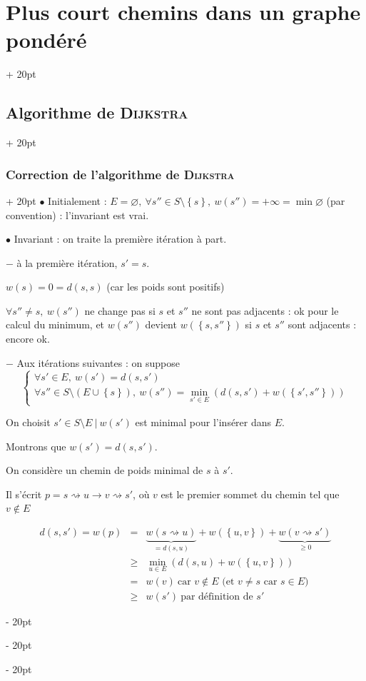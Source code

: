 \documentclass[a4paper, 12pt, twoside]{article}
\newcommand{\set}[1]{\left\{ #1 \right\}}
\renewcommand{\ge}{\geqslant}
\newcommand{\ind}[1][20pt]{\advance\leftskip + #1}
\newcommand{\deind}[1][20pt]{\advance\leftskip - #1}
\newenvironment{indt}[2][20pt]{#2 \par \ind[#1]}{\par \deind} %
\begin{document}
\begin{indt}{\section{Plus court chemins dans un graphe pondéré}}
\begin{indt}{\subsection{Algorithme de \textsc{Dijkstra}}}
\begin{indt}{\subsubsection{Correction de l'algorithme de \textsc{Dijkstra}}}
                $\bullet$ Initialement : $E = \varnothing,\ \forall s'' \in S \setminus \set s,\ w(s'') = +\infty = \min \varnothing$ (par convention) : l'invariant est vrai.

                \vspace{6pt}
                
                $\bullet$ Invariant : on traite la première itération à part.

                $-$ à la première itération, $s' = s$.

                $w(s) = 0 = d(s, s)$ (car les poids sont positifs)

                $\forall s'' \neq s,\ w(s'')$ ne change pas si $s$ et $s''$ ne sont pas adjacents : ok pour le calcul du minimum,
                et $w(s'')$ devient $w(\set{s, s''})$ si $s$ et $s''$ sont adjacents : encore ok.

                \vspace{6pt}
                
                $-$ Aux itérations suivantes : on suppose
                \[
                    \begin{cases}
                        \forall s' \in E,\ w(s') = d(s, s')
                        \\
                        \forall s'' \in S \setminus (E \cup \set s),\ w(s'') = \displaystyle \min_{s' \in E}(d(s, s') + w(\set{s', s''}))
                    \end{cases}
                \]

                On choisit $s' \in S \setminus E\ |\ w(s')$ est minimal pour l'insérer dans $E$.

                Montrons que $w(s') = d(s, s')$.

                On considère un chemin de poids minimal de $s$ à $s'$.

                Il s'écrit $p = s \rightsquigarrow u \rightarrow v \rightsquigarrow s'$, où $v$ est le premier sommet du chemin tel que $v \notin E$

                \[
                    \begin{array}{rcl}
                        d(s, s') =
                        w(p) &=&
                        \underbrace{w(s \rightsquigarrow u)}_{= d(s, u)}
                        + w(\set{u, v})
                        + \underbrace{w(v \rightsquigarrow s')}_{\ge 0}
                        \\
                        &\ge&
                        \displaystyle \min_{u \in E}(d(s, u) + w(\set{u, v}))
                        \\
                        &=& w(v)\ \text{car $v \notin E$ (et $v \neq s$ car $s \in E$)}
                        \\
                        &\ge& w(s')\ \text{par définition de $s'$}
                    \end{array}
                \]


\end{indt}
\end{indt}
\end{indt}
\end{document}
